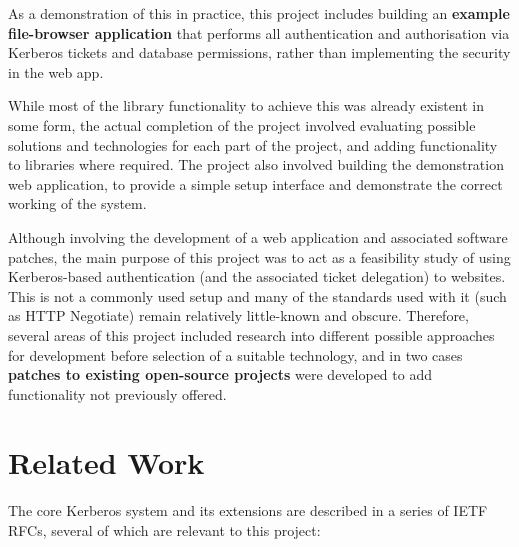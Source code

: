 \documentclass[12pt]{report}
\begin{document}
As a demonstration of this in practice, this project includes building an \textbf{example file-browser application} that performs all authentication and authorisation via Kerberos tickets and database permissions, rather than implementing the security in the web app.

While most of the library functionality to achieve this was already existent in some form, the actual completion of the project involved evaluating possible solutions and technologies for each part of the project, and adding functionality to libraries where required. The project also involved building the demonstration web application, to provide a simple setup interface and demonstrate the correct working of the system.

Although involving the development of a web application and associated software patches, the main purpose of this project was to act as a feasibility study of using Kerberos-based authentication (and the associated ticket delegation) to websites. This is not a commonly used setup and many of the standards used with it (such as HTTP Negotiate) remain relatively little-known and obscure. Therefore, several areas of this project included research into different possible approaches for development before selection of a suitable technology, and in two cases \textbf{patches to existing open-source projects} were developed to add functionality not previously offered.

\section{Related Work}
The core Kerberos system and its extensions are described in a series of IETF RFCs, several of which are relevant to this project:
\end{document}
